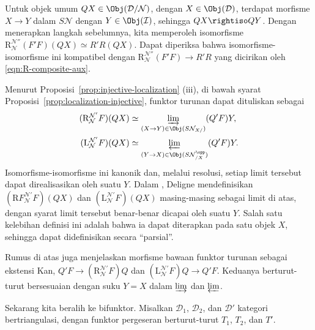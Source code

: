 \begin{bukti}
	Untuk objek umum $QX\in\Obj(\mathcal{D}/\mathcal{N})$, dengan
	$X\in\Obj(\mathcal{D})$, terdapat morfisme $X\to Y$ dalam
	$S\mathcal{N}$ dengan $Y\in\Obj(\mathcal{I})$, sehingga
	$QX\rightiso QY$. Dengan menerapkan langkah sebelumnya, kita memperoleh
	isomorfisme
	$\mathrm{R}^{\mathcal{N}''}_{\mathcal{N}}(F'F)(QX)\simeq R'R(QX)$.
	Dapat diperiksa bahwa isomorfisme-isomorfisme ini kompatibel dengan
	$\mathrm{R}^{\mathcal{N}''}_{\mathcal{N}}(F'F)\to R'R$ yang dicirikan oleh
	\eqref{eqn:R-composite-aux}.
\end{bukti}

\begin{catatan}\label{rem:Deligne-derived-functor}
	Menurut Proposisi~\ref{prop:injective-localization} (iii), di bawah syarat
	Proposisi~\ref{prop:localization-injective}, funktor turunan dapat dituliskan
	sebagai
	\begin{align*}
		(\mathrm{R}_{\mathcal{N}}^{\mathcal{N}'} F)(QX) & \simeq \varinjlim_{(X \to Y) \in \Obj(S\mathcal{N}_{X/})} (Q'F)Y, \\
		(\mathrm{L}_{\mathcal{N}}^{\mathcal{N}'} F)(QX) & \simeq \varprojlim_{(Y \to X) \in \Obj(S\mathcal{N}_{/X}^{\opp})} (Q'F)Y.
	\end{align*}
	Isomorfisme-isomorfisme ini kanonik dan, melalui resolusi, setiap limit
	tersebut dapat direalisasikan oleh suatu $Y$. Dalam
	\cite[Exp XVII, Déf 1.2.1]{SGA4-3}, Deligne mendefinisikan
	$(\mathrm{R}F_{\mathcal{N}}^{\mathcal{N}'} F)(QX)$ dan
	$(\mathrm{L}_{\mathcal{N}}^{\mathcal{N}'} F)(QX)$ masing-masing sebagai
	limit di atas, dengan syarat limit tersebut benar-benar dicapai oleh suatu
	$Y$. Salah satu kelebihan definisi ini adalah bahwa ia dapat diterapkan pada
	satu objek $X$, sehingga dapat didefinisikan secara ``parsial''.

	Rumus di atas juga menjelaskan morfisme bawaan funktor turunan sebagai
	ekstensi Kan,
	$Q'F\to(\mathrm{R}^{\mathcal{N}'}_{\mathcal{N}}F)Q$ dan
	$(\mathrm{L}^{\mathcal{N}'}_{\mathcal{N}}F)Q\to Q'F$. Keduanya berturut-turut
	bersesuaian dengan suku $Y=X$ dalam $\varinjlim$ dan $\varprojlim$.
\end{catatan}

Sekarang kita beralih ke bifunktor. Misalkan $\mathcal{D}_1$,
$\mathcal{D}_2$, dan $\mathcal{D}'$ kategori bertriangulasi, dengan funktor
pergeseran berturut-turut $T_1$, $T_2$, dan $T'$.

